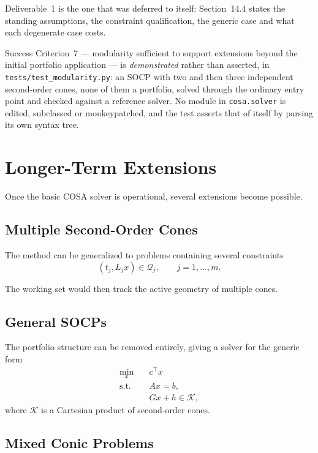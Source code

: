 \documentclass[11pt,a4paper]{article}
\begin{document}
Deliverable~1 is the one that was deferred to itself: Section~14.4
states the standing assumptions, the constraint qualification, the
generic case and what each degenerate case costs.

Success Criterion~7 --- modularity sufficient to support extensions
beyond the initial portfolio application --- is \emph{demonstrated}
rather than asserted, in \verb|tests/test_modularity.py|: an SOCP with
two and then three independent second-order cones, none of them a
portfolio, solved through the ordinary entry point and checked against
a reference solver. No module in \verb|cosa.solver| is edited,
subclassed or monkeypatched, and the test asserts that of itself by
parsing its own syntax tree.

\section{Longer-Term Extensions}

Once the basic COSA solver is operational, several extensions become
possible.

\subsection{Multiple Second-Order Cones}

The method can be generalized to problems containing several
constraints
\[
(t_j,L_jx)\in\mathcal Q_j,
\qquad
j=1,\ldots,m.
\]

The working set would then track the active geometry of multiple
cones.

\subsection{General SOCPs}

The portfolio structure can be removed entirely, giving a solver for
the generic form
\[
\begin{aligned}
\min_x\quad&
c^\top x\\
\text{s.t.}\quad&
Ax=b,\\
&Gx+h\in\mathcal K,
\end{aligned}
\]
where $\mathcal K$ is a Cartesian product of second-order cones.

\subsection{Mixed Conic Problems}
\end{document}
